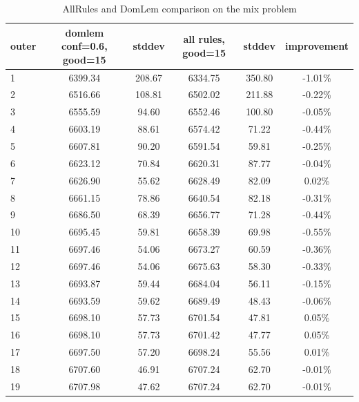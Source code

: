\begin{table}[htb]
  \centering
  \begin{tabular}{l c c c c c}
    \hline
outer & domlem conf=0.6, good=15 & stddev & all rules, good=15 & stddev & improvement \\
    \hline
    \hline
1 & 6399.34 & 208.67 & 6334.75 & 350.80 & -1.01\% \\
2 & 6516.66 & 108.81 & 6502.02 & 211.88 & -0.22\% \\
3 & 6555.59 & 94.60 & 6552.46 & 100.80 & -0.05\% \\
4 & 6603.19 & 88.61 & 6574.42 & 71.22 & -0.44\% \\
5 & 6607.81 & 90.20 & 6591.54 & 59.81 & -0.25\% \\
6 & 6623.12 & 70.84 & 6620.31 & 87.77 & -0.04\% \\
7 & 6626.90 & 55.62 & 6628.49 & 82.09 & 0.02\% \\
8 & 6661.15 & 78.86 & 6640.54 & 82.18 & -0.31\% \\
9 & 6686.50 & 68.39 & 6656.77 & 71.28 & -0.44\% \\
10 & 6695.45 & 59.81 & 6658.39 & 69.98 & -0.55\% \\
11 & 6697.46 & 54.06 & 6673.27 & 60.59 & -0.36\% \\
12 & 6697.46 & 54.06 & 6675.63 & 58.30 & -0.33\% \\
13 & 6693.87 & 59.44 & 6684.04 & 56.11 & -0.15\% \\
14 & 6693.59 & 59.62 & 6689.49 & 48.43 & -0.06\% \\
15 & 6698.10 & 57.73 & 6701.54 & 47.81 & 0.05\% \\
16 & 6698.10 & 57.73 & 6701.42 & 47.77 & 0.05\% \\
17 & 6697.50 & 57.20 & 6698.24 & 55.56 & 0.01\% \\
18 & 6707.60 & 46.91 & 6707.24 & 62.70 & -0.01\% \\
19 & 6707.98 & 47.62 & 6707.24 & 62.70 & -0.01\% \\
    \hline
  \end{tabular}
  \caption{AllRules and DomLem comparison on the mix problem}
  \label{t:un_alldom_2a}
\end{table}


